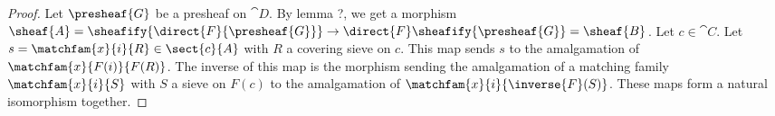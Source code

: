 \begin{proof}
Let $\presheaf{G}$ be a presheaf on $\cat{D}$.
By lemma ?, we get a morphism 
$\sheaf{A} = \sheafify{\direct{F}{\presheaf{G}}} \rightarrow \direct{F}\sheafify{\presheaf{G}} = \sheaf{B}$.
Let $c\in \cat{C}$.
Let $s = \matchfam{x}{i}{R} \in \sect{c}{A}$ with $R$ a covering sieve on $c$.
This map sends $s$ to the amalgamation of $\matchfam{x}{F(i)}{F(R)}$.
The inverse of this map is the morphism sending the amalgamation of a matching family $\matchfam{x}{i}{S}$ with $S$ a sieve on $F(c)$
to the amalgamation of $\matchfam{x}{i}{\inverse{F}(S)}$.
These maps form a natural isomorphism together.
\end{proof}
